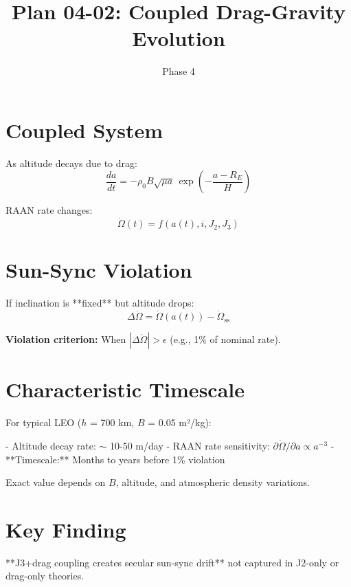\documentclass[11pt]{article}
\title{Plan 04-02: Coupled Drag-Gravity Evolution}
\date{Phase 4}
\begin{document}
\maketitle

\section{Coupled System}

As altitude decays due to drag:
$$\frac{da}{dt} = -\rho_0 B\sqrt{\mu a}\,\exp\left(-\frac{a - R_E}{H}\right)$$

RAAN rate changes:
$$\dot{\Omega}(t) = f(a(t), i, J_2, J_3)$$

\section{Sun-Sync Violation}

If inclination is **fixed** but altitude drops:
$$\Delta\dot{\Omega} = \dot{\Omega}(a(t)) - \dot{\Omega}_{\text{ss}}$$

\textbf{Violation criterion:} When $|\Delta\dot{\Omega}| > \epsilon$ (e.g., 1\% of nominal rate).

\section{Characteristic Timescale}

For typical LEO ($h$ = 700 km, $B$ = 0.05 m²/kg):

- Altitude decay rate: $\sim$ 10-50 m/day
- RAAN rate sensitivity: $\partial\dot{\Omega}/\partial a \propto a^{-3}$
- **Timescale:** Months to years before 1\% violation

Exact value depends on $B$, altitude, and atmospheric density variations.

\section{Key Finding}

**J3+drag coupling creates secular sun-sync drift** not captured in J2-only or drag-only theories.
\end{document}
